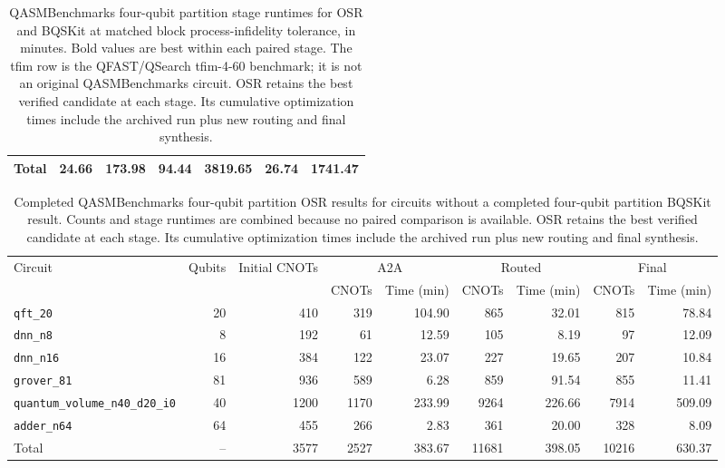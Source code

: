 \begin{table}[p]
\begin{tabular}{l|rrr|rrr}
\hline
Total & \textbf{24.66} & 173.98 & \textbf{94.44} & 3819.65 & \textbf{26.74} & 1741.47 \\
\hline
\end{tabular}
\caption{QASMBenchmarks four-qubit partition stage runtimes for OSR and BQSKit at matched block process-infidelity tolerance, in minutes. Bold values are best within each paired stage. The tfim row is the QFAST/QSearch tfim-4-60 benchmark; it is not an original QASMBenchmarks circuit. OSR retains the best verified candidate at each stage. Its cumulative optimization times include the archived run plus new routing and final synthesis.}
\label{tab:osr-bqskit-four-qubit-qasm-benchmarks-times}
\end{table}

\begin{table}[p]
\centering
\scriptsize
\begin{tabular}{lrr|rr|rr|rr}
\hline
Circuit & Qubits & Initial CNOTs & \multicolumn{2}{c|}{A2A} & \multicolumn{2}{c|}{Routed} & \multicolumn{2}{c}{Final} \\
 & & & CNOTs & Time (min) & CNOTs & Time (min) & CNOTs & Time (min) \\
\hline
\texttt{qft\_20} & 20 & 410 & 319 & 104.90 & 865 & 32.01 & 815 & 78.84 \\
\texttt{dnn\_n8} & 8 & 192 & 61 & 12.59 & 105 & 8.19 & 97 & 12.09 \\
\texttt{dnn\_n16} & 16 & 384 & 122 & 23.07 & 227 & 19.65 & 207 & 10.84 \\
\texttt{grover\_81} & 81 & 936 & 589 & 6.28 & 859 & 91.54 & 855 & 11.41 \\
\texttt{quantum\_volume\_n40\_d20\_i0} & 40 & 1200 & 1170 & 233.99 & 9264 & 226.66 & 7914 & 509.09 \\
\texttt{adder\_n64} & 64 & 455 & 266 & 2.83 & 361 & 20.00 & 328 & 8.09 \\
\hline
Total & -- & 3577 & 2527 & 383.67 & 11681 & 398.05 & 10216 & 630.37 \\
\hline
\end{tabular}
\caption{Completed QASMBenchmarks four-qubit partition OSR results for circuits without a completed four-qubit partition BQSKit result. Counts and stage runtimes are combined because no paired comparison is available. OSR retains the best verified candidate at each stage. Its cumulative optimization times include the archived run plus new routing and final synthesis.}
\label{tab:osr-four-qubit-unpaired-qasm-benchmarks}
\end{table}

